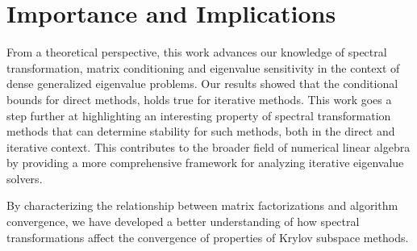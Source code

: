 \section{Importance and Implications}
From a theoretical perspective, this work advances our knowledge of spectral transformation, matrix conditioning and eigenvalue sensitivity in the context of dense generalized eigenvalue problems. Our results showed that the conditional bounds for direct methods, holds true for iterative methods. This work goes a step further at highlighting an interesting property of spectral transformation methods that can determine stability for such methods, both in the direct and iterative context. This contributes to the broader field of numerical linear algebra by providing a more comprehensive framework for analyzing iterative eigenvalue solvers.

By characterizing the relationship between matrix factorizations and algorithm convergence, we have developed a better understanding of how spectral transformations affect the convergence of properties of Krylov subspace methods.



